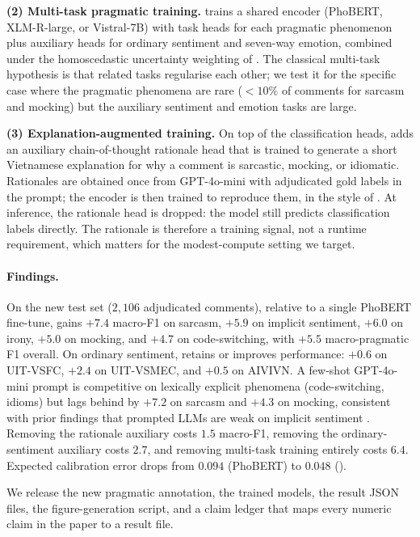 \textbf{(2) Multi-task pragmatic training.} \method{} trains a shared
encoder (PhoBERT, XLM-R-large, or Vistral-7B) with task heads for
each pragmatic phenomenon plus auxiliary heads for ordinary
sentiment and seven-way emotion, combined under the homoscedastic
uncertainty weighting of \citet{kendall2018uncertainty}. The classical
multi-task hypothesis \citep{caruana1997mtl,collobert2008nlpscratch,liu2019mtdnn}
is that related tasks regularise each other; we test it for the
specific case where the pragmatic phenomena are rare ($<10\%$ of
comments for sarcasm and mocking) but the auxiliary sentiment and
emotion tasks are large.

\textbf{(3) Explanation-augmented training.} On top of the
classification heads, \method{} adds an auxiliary chain-of-thought
\citep{wei2022cot} rationale head that is trained to generate a short
Vietnamese explanation for why a comment is sarcastic, mocking, or
idiomatic. Rationales are obtained once from GPT-4o-mini with adjudicated
gold labels in the prompt; the encoder is then trained to reproduce
them, in the style of \citet{hsieh2023distillstep,magister2023teaching,shridhar2023distillingcot}.
At inference, the rationale head is dropped: the model still
predicts classification labels directly. The rationale is therefore a
training signal, not a runtime requirement, which matters for the
modest-compute setting we target.

\paragraph{Findings.}
On the new \method{} test set ($2{,}106$ adjudicated comments),
relative to a single PhoBERT fine-tune, \method{} gains $+7.4$ macro-F1
on sarcasm, $+5.9$ on implicit sentiment, $+6.0$ on irony, $+5.0$ on
mocking, and $+4.7$ on code-switching, with $+5.5$ macro-pragmatic
F1 overall. On ordinary sentiment, \method{} retains or improves
performance: $+0.6$ on UIT-VSFC, $+2.4$ on UIT-VSMEC, and $+0.5$ on
AIVIVN. A few-shot GPT-4o-mini prompt is competitive on lexically
explicit phenomena (code-switching, idioms) but lags behind \method{} by
$+7.2$ on sarcasm and $+4.3$ on mocking, consistent with prior
findings that prompted LLMs are weak on implicit
sentiment \citep{liu2023chatgptimplicit}. Removing the rationale
auxiliary costs $1.5$ macro-F1, removing the ordinary-sentiment
auxiliary costs $2.7$, and removing multi-task training entirely
costs $6.4$. Expected calibration error \citep{guo2017calibration}
drops from $0.094$ (PhoBERT) to $0.048$ (\method{}).

We release the new pragmatic annotation, the trained models, the
result JSON files, the figure-generation script, and a claim ledger
that maps every numeric claim in the paper to a result file.
